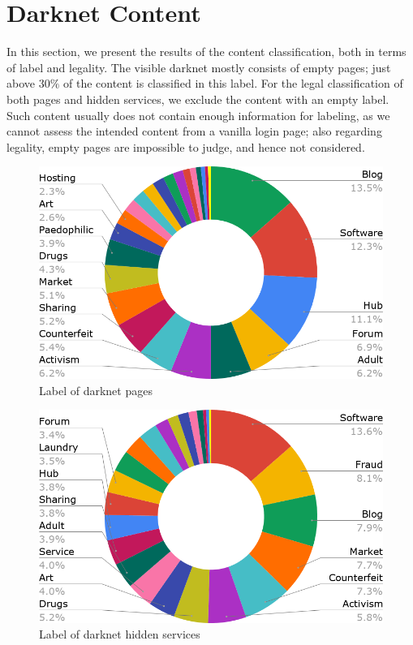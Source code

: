 \section{Darknet Content}
\label{sec:results}

In this section, we present the results of the content classification, both in terms of label and legality. 
The visible darknet mostly consists of empty pages; just above $30\%$ of the content is classified in this label. 
For the legal classification of both pages and hidden services, we exclude the content with an empty label. Such content usually does not contain enough information for labeling, as we cannot assess the intended content from a vanilla login page; also regarding legality, empty pages are impossible to judge, and hence not considered.

\begin{figure}[h]
\includegraphics[width=\linewidth]{images/labelsByContent.png}
\caption{Label of darknet pages}
\label{fig:labelsByContent}
\end{figure}

\begin{figure}[h]
\includegraphics[width=\linewidth]{images/labelsByHost.png}
\caption{Label of darknet hidden services}
\label{fig:labelsByHost}
\end{figure}

